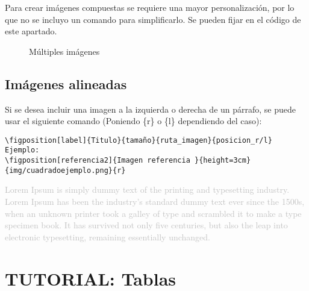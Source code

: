 Para crear imágenes compuestas se requiere una mayor personalización, por lo que no se incluyo un comando para simplificarlo. Se pueden fijar en el código de este apartado.

\begin{figure}[H]
 \centering
    \label{f:label_foto1}
    \label{f:label_foto2}
    \label{f:label_foto3}
 \caption{Múltiples imágenes}
 \label{f:label_multiples_imagenes}
\end{figure}

\subsection{Imágenes alineadas}
Si se desea incluir una imagen a la izquierda o derecha de un párrafo, se puede usar el siguiente comando (Poniendo \{r\} o \{l\} dependiendo del caso):
\begin{verbatim}
\figposition[label]{Titulo}{tamaño}{ruta_imagen}{posicion_r/l}
Ejemplo:
\figposition[referencia2]{Imagen referencia }{height=3cm}{img/cuadradoejemplo.png}{r}
\end{verbatim}

\textcolor{silver}{
    Lorem Ipsum is simply dummy text of the printing and typesetting industry. Lorem Ipsum has been the industry's standard dummy text ever since the 1500s, when an unknown printer took a galley of type and scrambled it to make a type specimen book. It has survived not only five centuries, but also the leap into electronic typesetting, remaining essentially unchanged.
    }

\newpage
\section{TUTORIAL: Tablas}

